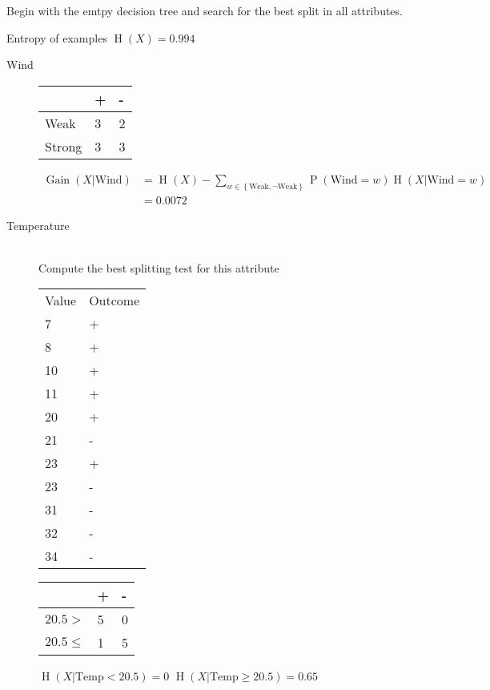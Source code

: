 \documentclass[10pt,a4paper,boxed]{hmcpset}
\DeclareMathOperator{\gain}{Gain}
\DeclareMathOperator{\entropy}{H}
\DeclareMathOperator{\prob}{P}
\begin{document}
	\begin{problem}[1. TDIDT]
	\end{problem}
	\begin{solution}
	Begin with the emtpy decision tree and search for the best split in all
	attributes.

	Entropy of examples $\entropy(X) = 0.994$
	\begin{description}
		\item[Wind]\hfill

			\begin{tabular}[H]{l|ll}
				& + & - \\ \hline
				Weak & 3 & 2 \\
				Strong & 3 & 3 \\
			\end{tabular}
			\begin{align}
				\gain(X|\mathrm{Wind}) &= \entropy(X) - \sum_{w \in \left\{ \mathrm{Weak}, \neg\mathrm{Weak}  \right\} } \prob(\mathrm{Wind}=w) \entropy(X|\mathrm{Wind}=w) \\
															 &= 0.0072
			\end{align}

		\item[Temperature] \hfill \\
			Compute the best splitting test for this attribute\\
				\begin{tabular}[H]{ll}
					Value & Outcome \\
					7&+\\
					8&+\\
					10&+\\
					11&+\\
					20&+\\
					21&-\\
					23&+\\
					23&-\\
					31&-\\
					32&-\\
					34&-\\
				\end{tabular}

			\begin{tabular}[H]{l|ll}
				& + & - \\ \hline
				$20.5 > $		& 5 & 0 \\
				$20.5 \leq$ & 1 & 5 \\
			\end{tabular}
			$\entropy(X|\mathrm{Temp}<20.5) = 0$
			$\entropy(X|\mathrm{Temp}\geq 20.5) = 0.65$


\end{description}
\end{solution}
\end{document}
